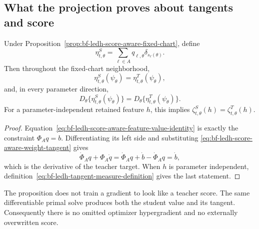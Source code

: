 \subsection{What the projection proves about tangents and score}

\begin{proposition}
\label{prop:bf-ledh-score-aware-tangent-preservation}
Under Proposition~\ref{prop:bf-ledh-score-aware-fixed-chart}, define
\[
  \eta^S_{t,\theta}=\sum_{\ell\in A}q_{\ell,\theta}
  \delta_{s_\ell(\theta)}.
\]
Then throughout the fixed-chart neighborhood,
\begin{equation}
\label{eq:bf-ledh-score-aware-feature-value-identity}
  \eta^S_{t,\theta}(\psi_\theta)
  =\eta^T_{t,\theta}(\psi_\theta),
\end{equation}
and, in every parameter direction,
\begin{equation}
\label{eq:bf-ledh-score-aware-feature-tangent-identity}
  D_\theta\{\eta^S_{t,\theta}(\psi_\theta)\}
  =D_\theta\{\eta^T_{t,\theta}(\psi_\theta)\}.
\end{equation}
For a parameter-independent retained feature \(h\), this implies
\(\zeta^S_{t,\theta}(h)=\zeta^T_{t,\theta}(h)\).
\end{proposition}

\begin{proof}
Equation~\eqref{eq:bf-ledh-score-aware-feature-value-identity} is exactly the
constraint \(\Phi_Aq=b\).  Differentiating its left side and substituting
\eqref{eq:bf-ledh-score-aware-weight-tangent} gives
\[
  \dot\Phi_Aq+\Phi_A\dot q
  =\dot\Phi_Aq+\dot b-\dot\Phi_Aq
  =\dot b,
\]
which is the derivative of the teacher target.  When \(h\) is parameter
independent, definition~\eqref{eq:bf-ledh-tangent-measure-definition} gives the
last statement.
\end{proof}

The proposition does not train a gradient to look like a teacher score.  The
same differentiable primal solve produces both the student value and its
tangent.  Consequently there is no omitted optimizer hypergradient and no
externally overwritten score.

